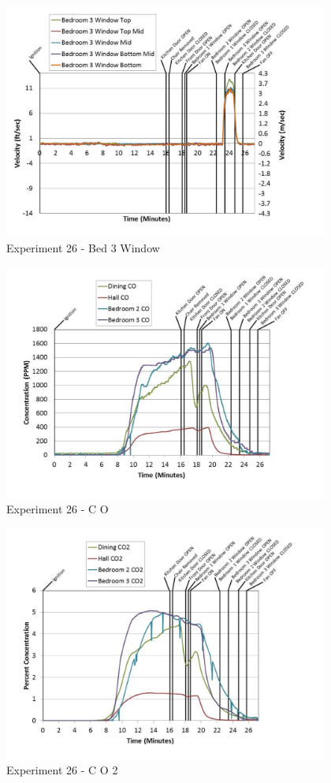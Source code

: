 \documentclass{article}
\begin{document}
\begin{appendices}
	\clearpage

	\begin{figure}[h!]
		\centering
		\includegraphics[height=3.05in]{0_Images/Results_Charts/Exp_26_Charts/Bed3Window.pdf}
		\caption{Experiment 26 - Bed 3 Window}
	\end{figure}
 

	\begin{figure}[h!]
		\centering
		\includegraphics[height=3.05in]{0_Images/Results_Charts/Exp_26_Charts/CO.pdf}
		\caption{Experiment 26 - C O}
	\end{figure}
 
	\clearpage

	\begin{figure}[h!]
		\centering
		\includegraphics[height=3.05in]{0_Images/Results_Charts/Exp_26_Charts/CO2.pdf}
		\caption{Experiment 26 - C O 2}
	\end{figure}
 


\end{appendices}
\end{document}
